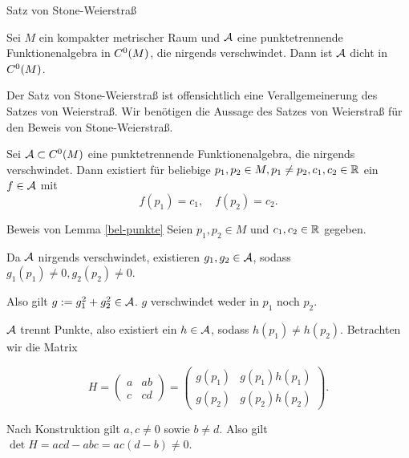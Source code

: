 \begin{frame}{Satz von Stone-Weierstraß}
    \begin{satz}
        Sei \(M\) ein kompakter metrischer Raum und \( \mathcal{A} \) eine punktetrennende
        Funktionenalgebra in \( C^0(M) \), die nirgends verschwindet. 
        Dann ist \( \mathcal{A} \) dicht in \( C^0(M) \).
    \end{satz}
    \pause
    \begin{bem}
        Der Satz von Stone-Weierstraß ist offensichtlich eine Verallgemeinerung 
        des Satzes von Weierstraß. 
        Wir benötigen die Aussage des Satzes von Weierstraß für den Beweis von Stone-Weierstraß.
    \end{bem}
\end{frame}

\begin{frame}
    \begin{lem}\label{bel-punkte}
        Sei \( \mathcal{A} \subset C^0(M) \) eine punktetrennende Funktionenalgebra, die nirgends verschwindet. 
        Dann existiert für beliebige \( p_1, p_2 \in M, p_1\neq p_2, 
        c_1, c_2 \in \mathbb{R} \)
        ein \(f \in \mathcal{A}\) mit 
        \[ f(p_1) = c_1, \quad f(p_2) = c_2. \]
    \end{lem}
\end{frame}

\begin{frame}{Beweis von Lemma \ref{bel-punkte}}
    Seien \( p_1, p_2 \in M \) und \( c_1, c_2 \in \mathbb{R} \) gegeben. 
    \pause

    Da \(\mathcal{A}\) nirgends verschwindet, existieren \( g_1, g_2 \in \mathcal{A} \), 
    sodass 
    \( g_1(p_1) \neq 0, g_2(p_2) \neq 0 \). 
    \pause

    Also gilt \( g := g_1^2 + g_2^2 \in \mathcal{A} \). \(g\) verschwindet weder in \(p_1\) noch \(p_2\).
    \pause 

    \(\mathcal{A}\) trennt Punkte, also existiert ein \( h \in \mathcal{A} \), sodass 
    \( h(p_1) \neq h(p_2) \).
    \pause 
    Betrachten wir die Matrix 

    \[ H = \begin{pmatrix}
        a & ab \\
        c & cd
    \end{pmatrix} = \begin{pmatrix}
        g(p_1) & g(p_1) h(p_1) \\
        g(p_2) & g(p_2) h(p_2)
    \end{pmatrix}. \]
    \pause

    Nach Konstruktion gilt 
    \( a, c \neq 0 \) sowie \(b \neq d\). Also gilt \( \det H = acd - abc = ac(d - b) \neq 0 \). 
\end{frame}


